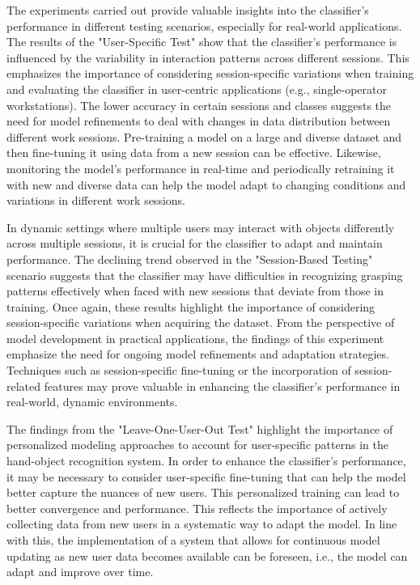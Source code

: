 The experiments carried out provide valuable insights into the classifier's performance in different testing scenarios, especially for real-world applications. The results of the "User-Specific Test" show that the classifier's performance is influenced by the variability in interaction patterns across different sessions. This emphasizes the importance of considering session-specific variations when training and evaluating the classifier in user-centric applications (e.g., single-operator workstations). The lower accuracy in certain sessions and classes suggests the need for model refinements to deal with changes in data distribution between different work sessions. Pre-training a model on a large and diverse dataset and then fine-tuning it using data from a new session can be effective. Likewise, monitoring the model's performance in real-time and periodically retraining it with new and diverse data can help the model adapt to changing conditions and variations in different work sessions.

In dynamic settings where multiple users may interact with objects differently across multiple sessions, it is crucial for the classifier to adapt and maintain performance. The declining trend observed in the "Session-Based Testing" scenario suggests that the classifier may have difficulties in recognizing grasping patterns effectively when faced with new sessions that deviate from those in training. Once again, these results highlight the importance of considering session-specific variations when acquiring the dataset. From the perspective of model development in practical applications, the findings of this experiment emphasize the need for ongoing model refinements and adaptation strategies. Techniques such as session-specific fine-tuning or the incorporation of session-related features may prove valuable in enhancing the classifier's performance in real-world, dynamic environments.

The findings from the "Leave-One-User-Out Test" highlight the importance of personalized modeling approaches to account for user-specific patterns in the hand-object recognition system. In order to enhance the classifier's performance, it may be necessary to consider user-specific fine-tuning that can help the model better capture the nuances of new users. This personalized training can lead to better convergence and performance. This reflects the importance of actively collecting data from new users in a systematic way to adapt the model. In line with this, the implementation of a system that allows for continuous model updating as new user data becomes available can be foreseen, i.e., the model can adapt and improve over time.
